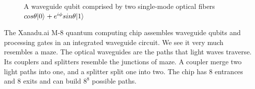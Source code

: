 \documentclass[oneside, letter, 12pt]{book}
\begin{document}
\begin{figure}[h]\label{Fiber}
\caption{A waveguide qubit comprised by two single-mode optical fibers $cos{\theta} \vert {0} \rangle_{} + e^{i \phi} sin{\theta} \vert {1} \rangle_{}$}
\end{figure}

The Xanadu.ai M-8 quantum computing chip assembles waveguide qubits and processing gates in an integrated waveguide circuit. We see it very much resembles a maze. The optical waveguides are the paths that light waves traverse. Its couplers and splitters resemble the junctions of maze. A coupler merge two light paths into one, and a splitter split one into two. The chip has 8 entrances and 8 exits and can build $8^8$ possible paths.
\end{document}
